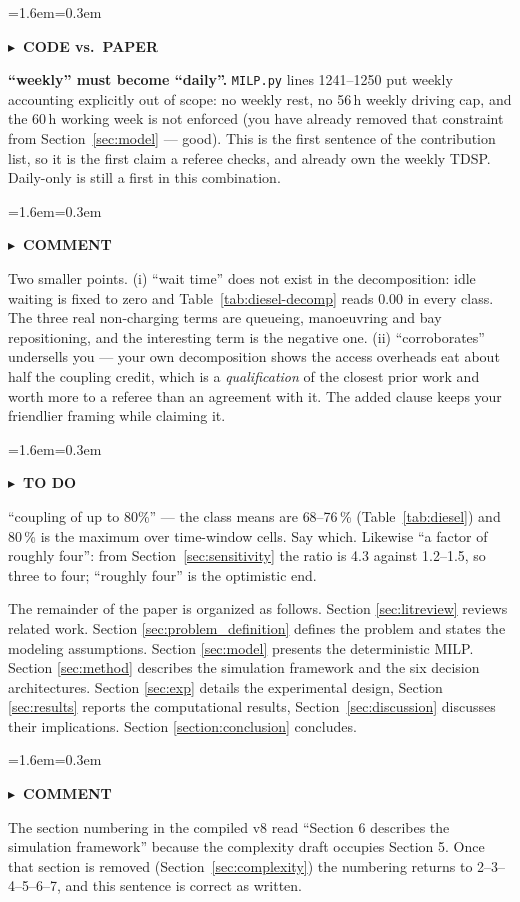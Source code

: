 \documentclass[preprint,12pt,3p]{elsarticle}
\newcommand{\FIX}[1]{{\color{annred}#1}}
\newcommand{\prov}[1]{{\setlength{\fboxsep}{1pt}\colorbox{provyellow}{#1}}}
\newenvironment{ann}[2]{%
  \par\addvspace{4pt}%
  \begin{list}{}{\leftmargin=1.6em\rightmargin=0.3em\topsep=0pt\parsep=3pt\itemsep=0pt\listparindent=0pt}%
  \item[]\color{#1}\small\textbf{\textsf{#2}}\par\nopagebreak\vspace{1pt}\color{#1}\small\ignorespaces}
  {\end{list}\addvspace{4pt}}
\newenvironment{acmt}{\begin{ann}{anngreen}{$\blacktriangleright$\ COMMENT}}{\end{ann}}
\newenvironment{atodo}{\begin{ann}{annblue}{$\blacktriangleright$\ TO DO}}{\end{ann}}
\newenvironment{acode}{\begin{ann}{annorange}{$\blacktriangleright$\ CODE vs.\ PAPER}}{\end{ann}}
\begin{document}
\begin{acode}
\textbf{``weekly'' must become ``daily''.} \texttt{MILP.py} lines 1241--1250 put
weekly accounting explicitly out of scope: no weekly rest, no 56\,h weekly
driving cap, and the 60\,h working week is not enforced (you have already removed
that constraint from Section~\ref{sec:model} --- good). This is the first
sentence of the contribution list, so it is the first claim a referee checks, and
\citet{garaix_label-setting_2024} already own the weekly TDSP. Daily-only is
still a first in this combination.
\end{acode}

\begin{acmt}
Two smaller points. (i) ``wait time'' does not exist in the decomposition: idle
waiting is fixed to zero and Table~\ref{tab:diesel-decomp} reads $0.00$ in every
class. The three real non-charging terms are queueing, manoeuvring and bay
repositioning, and the interesting term is the negative one. (ii) ``corroborates''
undersells you --- your own decomposition shows the access overheads eat about half
the coupling credit, which is a \emph{qualification} of the closest prior work
and worth more to a referee than an agreement with it. The added clause keeps
your friendlier framing while claiming it.
\end{acmt}

\begin{atodo}
``coupling of up to 80\%'' --- the class means are \prov{68--76\,\%}
(Table~\ref{tab:diesel}) and 80\,\% is the maximum over time-window cells. Say
which. Likewise ``a factor of roughly four'': from
Section~\ref{sec:sensitivity} the ratio is \prov{4.3} against \prov{1.2--1.5},
so three to four; ``roughly four'' is the optimistic end.
\end{atodo}

The remainder of the paper is organized as follows. Section \ref{sec:litreview} reviews related work. Section \ref{sec:problem_definition} defines the problem and states the modeling assumptions. Section \ref{sec:model} presents the deterministic MILP. Section \ref{sec:method} describes the simulation framework and the {six} decision architectures. Section \ref{sec:exp} details the experimental design, Section \ref{sec:results} reports the computational results\FIX{, Section~\ref{sec:discussion} discusses their implications}. Section \ref{section:conclusion} concludes.

\begin{acmt}
The section numbering in the compiled v8 read ``Section 6 describes the
simulation framework'' because the complexity draft occupies Section 5. Once that
section is removed (Section~\ref{sec:complexity}) the numbering returns to
2--3--4--5--6--7, and this sentence is correct as written.
\end{acmt}
\end{document}
